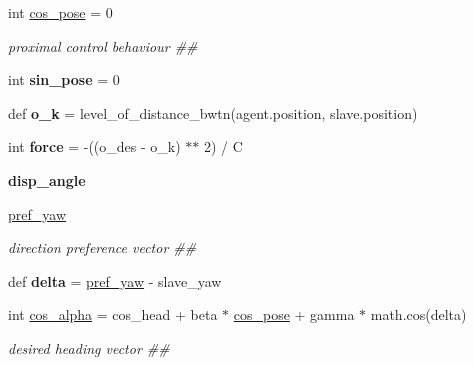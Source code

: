 \begin{DoxyCompactItemize}
\item 
\mbox{\label{namespaceagent__controller_aabbeeec31bfb6dc26d18cdd4176eeca4}} 
int \hyperlink{namespaceagent__controller_aabbeeec31bfb6dc26d18cdd4176eeca4}{cos\+\_\+pose} = 0
\begin{DoxyCompactList}\small\item\em proximal control behaviour \#\# \end{DoxyCompactList}\item 
\mbox{\label{namespaceagent__controller_a95f2cc7b1f1f47547f926e0d37f1ce70}} 
int {\bfseries sin\+\_\+pose} = 0
\item 
\mbox{\label{namespaceagent__controller_ac014c161712e28190b07e334e18ebed3}} 
def {\bfseries o\+\_\+k} = level\+\_\+of\+\_\+distance\+\_\+bwtn(agent.\+position, slave.\+position)
\item 
\mbox{\label{namespaceagent__controller_a4a11194757c4c08336166689bf0769e2}} 
int {\bfseries force} = -\/((o\+\_\+des -\/ o\+\_\+k) $\ast$$\ast$ 2) / C
\item 
{\bfseries disp\+\_\+angle}
\item 
\hyperlink{namespaceagent__controller_a6a5de8c478e70c41a2c478775c929cc4}{pref\+\_\+yaw}
\begin{DoxyCompactList}\small\item\em direction preference vector \#\# \end{DoxyCompactList}\item 
\mbox{\label{namespaceagent__controller_a1fc80d4b0128e673c95daa8dbabf1369}} 
def {\bfseries delta} = \hyperlink{namespaceagent__controller_a6a5de8c478e70c41a2c478775c929cc4}{pref\+\_\+yaw} -\/ slave\+\_\+yaw
\item 
\mbox{\label{namespaceagent__controller_af55b643e95edd2f6f1df4d088a407e8c}} 
int \hyperlink{namespaceagent__controller_af55b643e95edd2f6f1df4d088a407e8c}{cos\+\_\+alpha} = cos\+\_\+head + beta $\ast$ \hyperlink{namespaceagent__controller_aabbeeec31bfb6dc26d18cdd4176eeca4}{cos\+\_\+pose} + gamma $\ast$ math.\+cos(delta)
\begin{DoxyCompactList}\small\item\em desired heading vector \#\# \end{DoxyCompactList}\item 
$$
\end{DoxyCompactItemize}
